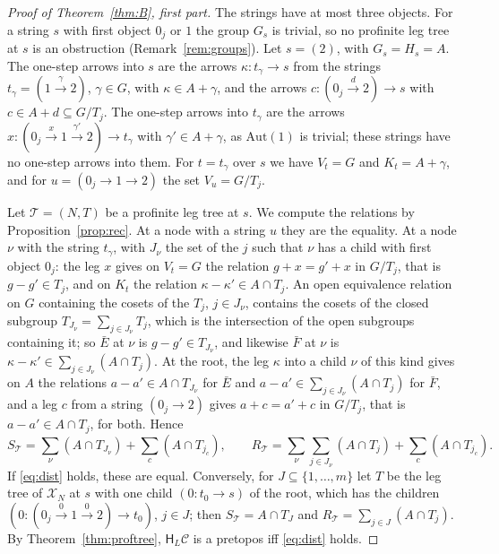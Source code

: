 \documentclass[11pt]{amsart}
\theoremstyle{definition}
\newcommand{\Aut}{\mathrm{Aut}}
\newcommand{\HH}{\mathsf H}
\newcommand{\cX}{\mathcal X}
\newcommand{\cC}{\mathcal C}
\begin{document}
\begin{proof}[Proof of Theorem~\ref{thm:B}, first part]
The strings have at most three objects. For a string $s$ with first
object $0_j$ or $1$ the group $G_s$ is trivial, so no profinite leg
tree at $s$ is an obstruction (Remark~\ref{rem:groups}). Let $s=(2)$,
with $G_s=H_s=A$. The one-step arrows into $s$ are the arrows
$\kappa\colon t_\gamma\to s$ from the strings $t_\gamma=(1\xrightarrow
{\gamma}2)$, $\gamma\in G$, with $\kappa\in A+\gamma$, and the arrows
$c\colon(0_j\xrightarrow{d}2)\to s$ with $c\in A+d\subseteq G/T_j$. The one-step arrows into
$t_\gamma$ are the arrows $x\colon(0_j\xrightarrow{x}1\xrightarrow
{\gamma'}2)\to t_\gamma$ with $\gamma'\in A+\gamma$, as $\Aut(1)$ is
trivial; these strings have no one-step arrows into them. For
$t=t_\gamma$ over $s$ we have $V_t=G$ and $K_t=A+\gamma$, and for
$u=(0_j\to1\to2)$ the set $V_u=G/T_j$.

Let $\mathcal T=(N,T)$ be a profinite leg tree at $s$. We compute the
relations by Proposition~\ref{prop:rec}. At a node with a string $u$
they are the equality. At a node $\nu$ with the string $t_\gamma$,
with $J_\nu$ the set of the $j$ such that $\nu$ has a child with first
object $0_j$: the leg $x$ gives on $V_t=G$ the relation $g+x=g'+x$ in
$G/T_j$, that is $g-g'\in T_j$, and on $K_t$ the relation
$\kappa-\kappa'\in A\cap T_j$. An open equivalence relation on $G$
containing the cosets of the $T_j$, $j\in J_\nu$, contains the cosets
of the closed subgroup $T_{J_\nu}=\sum_{j\in J_\nu}T_j$, which is the
intersection of the open subgroups containing it; so $\bar E$ at $\nu$
is $g-g'\in T_{J_\nu}$, and likewise $\bar F$ at $\nu$ is
$\kappa-\kappa'\in\sum_{j\in J_\nu}(A\cap T_j)$. At the root, the leg
$\kappa$ into a child $\nu$ of this kind gives on $A$ the relations
$a-a'\in A\cap T_{J_\nu}$ for $\bar E$ and $a-a'\in\sum_{j\in J_\nu}
(A\cap T_j)$ for $\bar F$, and a leg $c$ from a string $(0_j\to2)$ gives
$a+c=a'+c$ in $G/T_j$, that is $a-a'\in A\cap T_j$, for both. Hence
\[
S_{\mathcal T}=\sum_\nu(A\cap T_{J_\nu})+\sum_c(A\cap T_{j_c}),\qquad
R_{\mathcal T}=\sum_\nu\sum_{j\in J_\nu}(A\cap T_j)+\sum_c(A\cap
T_{j_c}).
\]
If \eqref{eq:dist} holds, these are equal. Conversely, for
$J\subseteq\{1,\dots,m\}$ let $T$ be the leg tree of $\cX_N$ at $s$
with one child $(0\colon t_0\to s)$ of the root, which has the
children $(0\colon(0_j\xrightarrow{0}1\xrightarrow{0}2)\to t_0)$,
$j\in J$; then $S_{\mathcal T}=A\cap T_J$ and $R_{\mathcal T}=\sum_{j
\in J}(A\cap T_j)$. By Theorem~\ref{thm:proftree}, $\HH_L\cC$ is a
pretopos iff \eqref{eq:dist} holds.
\end{proof}
\end{document}
